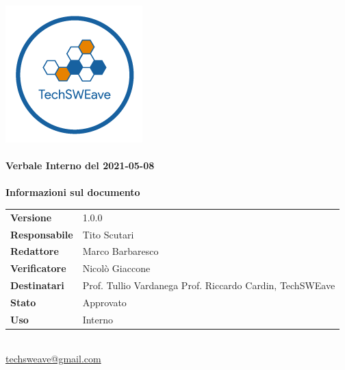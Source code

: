\documentclass[a4paper]{article}
\begin{document}
\begin{titlepage}
    \begin{center}
        \includegraphics{../../../../Images/logo.png}\\
        \vspace{20px}
        \textcolor{logo}{\hrulefill}\\
        \vspace{20px}
        \textbf{\huge\textcolor{logo}{Verbale Interno del 2021-05-08}}\\
        \vspace{10px}
        \textcolor{logo}{\hrulefill}\\
        \vspace{40px}
        \textbf{\Large Informazioni sul documento}\\
        \vspace{20px}
        \begin{tabular}{p{100px} | p{100px}}
            \textbf{Versione}     & 1.0.0                                                                      \\
            \textbf{Responsabile} & Tito Scutari                                                               \\
            \textbf{Redattore}    & Marco Barbaresco                                                           \\
            \textbf{Verificatore} & Nicolò Giaccone                                                            \\
            \textbf{Destinatari}  & Prof. Tullio Vardanega \newline Prof. Riccardo Cardin, \newline TechSWEave \\
            \textbf{Stato}        & Approvato                                                                  \\
            \textbf{Uso}          & Interno                                                                    \\
        \end{tabular}\\
        \vspace{60px}
        \href{mailto:techsweave@gmail.com}{techsweave@gmail.com}\\

    \end{center}
\end{titlepage}
\end{document}
